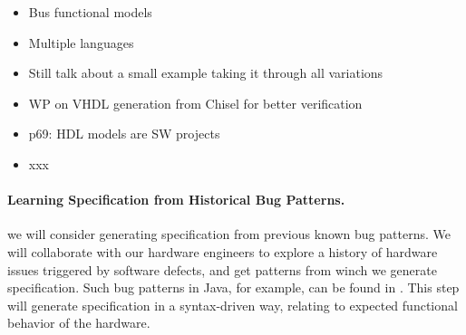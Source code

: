 \documentclass[fleqn,12pt]{article}
\begin{document}
\begin{itemize}
\item Bus functional models
\item Multiple languages
\item Still talk about a small example taking it through all variations
\item WP on VHDL generation from Chisel for better verification
\item p69: HDL models are SW projects

\end{itemize}

\begin{itemize}
\item xxx
\end{itemize}










\paragraph{Learning Specification from Historical Bug Patterns.}
we will consider generating specification from previous known bug
patterns.  We will collaborate with our hardware engineers to explore
a history of hardware issues triggered by software defects, and get
patterns from winch we generate specification.  Such bug patterns in
Java, for example, can be found in \cite{web:findbugs_bugs}.  This
step will generate specification in a syntax-driven way, relating to
expected functional behavior of the hardware.
\end{document}

